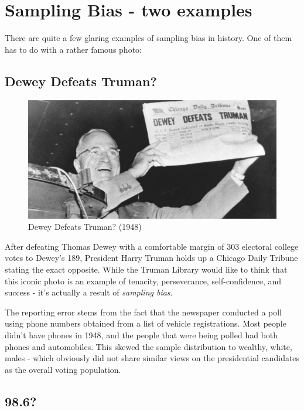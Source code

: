 \documentclass[
]{book}
\begin{document}
\hypertarget{sampling-bias---two-examples}{%
\section{Sampling Bias - two examples}\label{sampling-bias---two-examples}}

There are quite a few glaring examples of sampling bias in history. One of them has to do with a rather famous photo:

\hypertarget{dewey-defeats-truman}{%
\subsection{Dewey Defeats Truman?}\label{dewey-defeats-truman}}

\begin{figure}

{\centering \includegraphics[width=0.5\linewidth]{images/timeline-truman-second-term} 

}

\caption{Dewey Defeats Truman? (1948)}\label{fig:unnamed-chunk-21}
\end{figure}

After defeating Thomas Dewey with a comfortable margin of 303 electoral college votes to Dewey's 189, President Harry Truman holds up a Chicago Daily Tribune stating the exact opposite. While the Truman Library would like to think that this iconic photo is an example of tenacity, perseverance, self-confidence, and success - it's actually a result of \emph{sampling bias}.

The reporting error stems from the fact that the newspaper conducted a poll using phone numbers obtained from a list of vehicle registrations. Most people didn't have phones in 1948, and the people that were being polled had both phones and automobiles. This skewed the sample distribution to wealthy, white, males - which obviously did not share similar views on the presidential candidates as the overall voting population.

\hypertarget{section-1}{%
\subsection{98.6?}\label{section-1}}
\end{document}
